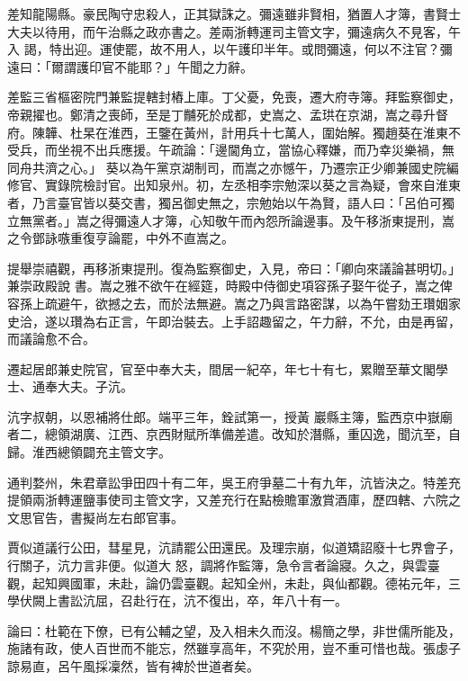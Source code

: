 \begin{pinyinscope}
 差知龍陽縣。豪民陶守忠殺人，正其獄誅之。彌遠雖非賢相，猶置人才簿，書賢士大夫以待用，而午治縣之政亦書之。差兩浙轉運司主管文字，彌遠病久不見客，午入
 謁，特出迎。運使罷，故不用人，以午護印半年。或問彌遠，何以不注官？彌遠曰：「爾謂護印官不能耶？」午聞之力辭。



 差監三省樞密院門兼監提轄封樁上庫。丁父憂，免喪，遷大府寺簿。拜監察御史，帝親擢也。鄭清之喪師，至是丁黼死於成都，史嵩之、孟珙在京湖，嵩之尋升督府。陳韡、杜杲在淮西，王鑒在黃州，計用兵十七萬人，圍始解。獨趙葵在淮東不受兵，而坐視不出兵應援。午疏論：「邊閫角立，當協心釋嫌，而乃幸災樂禍，無同舟共濟之心。」
 葵以為午黨京湖制司，而嵩之亦憾午，乃遷宗正少卿兼國史院編修官、實錄院檢討官。出知泉州。初，左丞相李宗勉深以葵之言為疑，會來自淮東者，乃言臺官皆以葵交書，獨呂御史無之，宗勉始以午為賢，語人曰：「呂伯可獨立無黨者。」嵩之得彌遠人才簿，心知敬午而內怨所論邊事。及午移浙東提刑，嵩之令鄧詠嗾重復亨論罷，中外不直嵩之。



 提舉崇禧觀，再移浙東提刑。復為監察御史，入見，帝曰：「卿向來議論甚明切。」兼崇政殿說
 書。嵩之雅不欲午在經筵，時殿中侍御史項容孫子娶午從子，嵩之俾容孫上疏避午，欲撼之去，而於法無避。嵩之乃與言路密謀，以為午嘗劾王瓚姻家史洽，遂以瓚為右正言，午即治裝去。上手詔趣留之，午力辭，不允，由是再留，而議論愈不合。



 遷起居郎兼史院官，官至中奉大夫，間居一紀卒，年七十有七，累贈至華文閣學士、通奉大夫。子沆。



 沆字叔朝，以恩補將仕郎。端平三年，銓試第一，授黃
 巖縣主簿，監西京中嶽廟者二，總領湖廣、江西、京西財賦所準備差遣。改知於潛縣，重囚逸，聞沆至，自歸。淮西總領闢充主管文字。



 通判婺州，朱君章訟爭田四十有二年，吳王府爭墓二十有九年，沆皆決之。特差充提領兩浙轉運鹽事使司主管文字，又差充行在點檢贍軍激賞酒庫，歷四轄、六院之文思官告，書擬尚左右郎官事。



 賈似道議行公田，彗星見，沆請罷公田還民。及理宗崩，似道矯詔廢十七界會子，行關子，沆力言非便。似道大
 怒，調將作監簿，急令言者論寢。久之，與雲臺觀，起知興國軍，未赴，論仍雲臺觀。起知全州，未赴，與仙都觀。德祐元年，三學伏闕上書訟沆屈，召赴行在，沆不復出，卒，年八十有一。



 論曰：杜範在下僚，已有公輔之望，及入相未久而沒。楊簡之學，非世儒所能及，施諸有政，使人百世而不能忘，然雖享高年，不究於用，豈不重可惜也哉。張虙子諒易直，呂午風採凜然，皆有裨於世道者矣。



\end{pinyinscope}